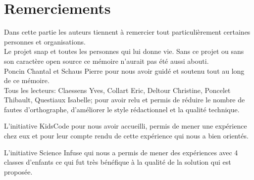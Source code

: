 ﻿\section*{Remerciements}
Dans cette partie les auteurs tiennent à remercier tout particulièrement certaines personnes et organisations.\\

Le projet \gls{snap} et toutes les personnes qui lui donne vie. Sans ce projet ou sans son caractère open source ce mémoire n'aurait pas été aussi abouti.\\

Poncin Chantal et Schaus Pierre pour nous avoir guidé et soutenu tout au long de ce mémoire.\\

Tous les lecteurs: Claessens Yves, Collart Eric, Deltour Christine, Poncelet Thibault, Questiaux Isabelle; pour avoir relu et permis de réduire le nombre de fautes d'orthographe, d'améliorer le style rédactionnel et la qualité technique.

L'initiative KidsCode pour nous avoir accueilli, permis de mener une expérience chez eux et pour leur compte rendu de cette expérience qui nous a bien orientés.

L'initiative Science Infuse qui nous a permis de mener des expériences avec 4 classes d'enfants ce qui fut très bénéfique à la qualité de la solution qui est proposée.
